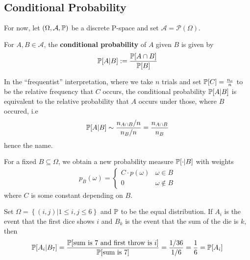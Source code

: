 \subsection{Conditional Probability}
For now, let $(\Omega,\mathcal{A},\mathbb{P})$ be a discrete P-space and set $\mathcal{A} = \mathcal{P}(\Omega)$. 

\begin{dfn}[]
  For $A, B \in \mathcal{A}$, the \textbf{conditional probability} of $A$ given $B$ is given by
  \begin{align*}
    \mathbb{P}[A|B] := \frac{\mathbb{P}[A \cap B]}{\mathbb{P}[B]}
  \end{align*}
\end{dfn}

In the ``frequentist'' interpretation, where we take $n$ trials and set $\mathbb{P}[C] = \frac{n_c}{n}$ to be the relative frequency that $C$ occurs, the conditional probability $\mathbb{P}[A|B]$ is equivalent to the relative probability that $A$ occurs under those, where $B$ occured, i.e
\begin{align*}
  \mathbb{P}[A|B] \sim \frac{n_{A \cap B}/n}{n_B / n} = \frac{n_{A\cap B}}{n_B}
\end{align*}
hence the name.


For a fixed $B \subseteq \Omega$, we obtain a new probability measure $\mathbb{P}[\cdot|B]$ with weights
\begin{align*}
  p_B(\omega) = \left\{\begin{array}{ll}
      C \cdot p(\omega) & \omega \in B \\
    0 & \omega \notin B
  \end{array} \right.
\end{align*}
where $C$ is some constant depending on $B$.


\begin{ex}
  Set $\Omega = \left\{(i,j) \big\vert 1 \leq i,j \leq 6\right\}$ and $\mathbb{P}$ to be the equal distribution.
  If $A_i$ is the event that the first dice shows $i$ and $B_k$ is the event that the sum of the die is $k$, then
  \begin{align*}
    \mathbb{P}[A_i|B_7] = \frac{\mathbb{P}[\text{sum is $7$ and first throw is $i$}]}{\mathbb{P}[\text{sum is $7$}]} = \frac{1/36}{1/6} = \frac{1}{6} = \mathbb{P}[A_i]
  \end{align*}
\end{ex}



